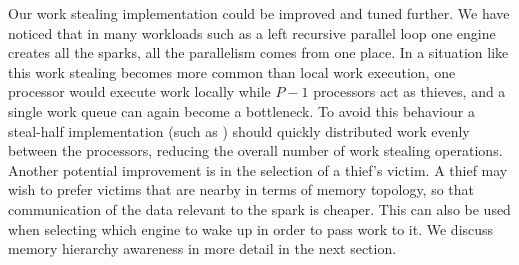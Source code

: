 



Our work stealing implementation could be improved and tuned further.
We have noticed that in many workloads such as a left recursive parallel
loop one engine creates all the sparks, all the parallelism comes from one
place.
In a situation like this work stealing becomes more common than local work
execution,
one processor would execute work locally while $P - 1$ processors act as
thieves, and a single work queue can again become a bottleneck.
To avoid this behaviour
a steal-half implementation (such as \citet{hendler:2002:stealhalf})
should quickly distributed work evenly between the processors,
reducing the overall number of work stealing operations.
Another potential improvement is in the selection of a thief's victim.
A thief may wish to prefer victims that are nearby in terms of memory
topology, so that communication of the data relevant to the spark is
cheaper.
This can also be used when selecting which engine to wake up in order to
pass work to it.
We discuss memory hierarchy awareness in more detail in the next section.

